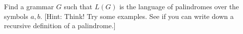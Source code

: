 Find a grammar $G$ such that $L(G)$ is the language of palindromes over the
symbols $a, b$. [Hint: Think! Try some examples. See if you can write down
a recursive definition of a palindrome.]
